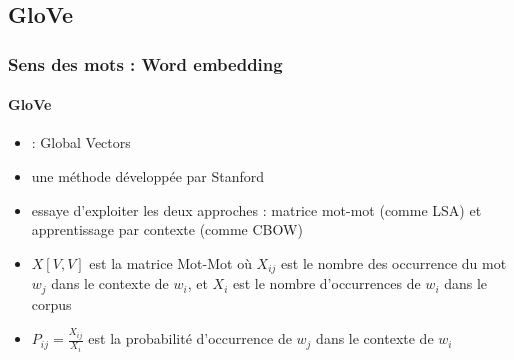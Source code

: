 \documentclass[xcolor=table]{beamer}
\begin{document}
\subsection{GloVe}

\begin{frame}
\frametitle{Sens des mots : Word embedding}
\framesubtitle{GloVe}

\begin{itemize}
	\item {} : Global Vectors
	\item une méthode développée par Stanford \cite{2014-pennington-al}
	\item essaye d'exploiter les deux approches : matrice mot-mot (comme LSA) et apprentissage par contexte (comme CBOW)
	\item $X[V, V]$ est la matrice Mot-Mot où $X_{ij}$ est le nombre des occurrence du mot $w_j$ dans le contexte de $w_i$, et $X_i$ est le nombre d'occurrences de $w_i$ dans le corpus
	\item $P_{ij} = \frac{X_{ij}}{X_i}$ est la probabilité d'occurrence de $w_j$ dans le contexte de $w_i$
\end{itemize}


\end{frame}
\end{document}
